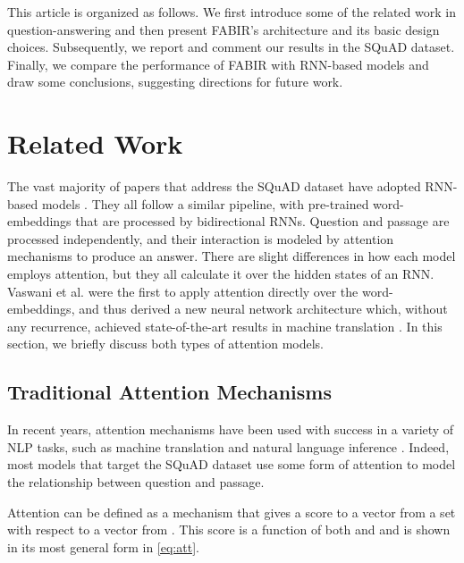 \documentclass[conference, letterpaper, 10pt]{IEEEtran}
\begin{document}
This article is organized as follows. We first introduce some of the related work in question-answering and then present FABIR's architecture and its basic design choices. Subsequently, we report and comment our results in the SQuAD dataset. Finally, we compare the performance of FABIR with RNN-based models and draw some conclusions, suggesting directions for future work.


\section{Related Work}

The vast majority of papers that address the SQuAD dataset have adopted RNN-based models \cite{Hu2017,PanLZCCH17,Salant2017,Xiaodong2017,Yang2017,Hsin2017,  DBLP:journals/corr/abs-1711-00106,RiuLiu2017,bidaf+self-att,Zhequian2017,DBLP:journals/corr/GongB17,DBLP:journals/corr/ZhangZCDWJ17,DBLP:journals/corr/ShenHGC16,Chen2017,DBLP:journals/corr/LeeKP016,DBLP:journals/corr/WeissenbornWS17,DBLP:journals/corr/WangMHF16,DBLP:journals/corr/LiuHWYN17,Seo2016,Xiong2016,Wang16,DBLP:journals/corr/YangDYHCS16,DBLP:journals/corr/BahdanauBJGVB17,DBLP:journals/corr/YuZHYXZ16}. 
They all follow a similar pipeline, with pre-trained word-embeddings that are processed by bidirectional RNNs. Question and passage are processed independently, and their interaction is modeled by attention mechanisms \cite{Bahdanau2014} to produce an answer. There are slight differences in how each model employs attention, but they all calculate it over the hidden states of an RNN. Vaswani et al. were the first to apply attention directly over the word-embeddings, and thus derived a new neural network architecture which, without any recurrence, achieved state-of-the-art results in machine translation \cite{Vaswani}. In this section, we briefly discuss both types of attention models.

\subsection{Traditional Attention Mechanisms}
In recent years, attention mechanisms have been used with success in a variety of NLP tasks, such as machine translation \cite{Bahdanau2014,Vaswani} and natural language inference \cite{Rocktaschel16,WangJ15b}. Indeed, most models that target the SQuAD dataset use some form of attention to model the relationship between question and passage.

Attention can be defined as a mechanism that gives a score  to a vector  from a set  with respect to a vector  from . This score is a function of both  and  and is shown in its most general form in \eqref{eq:att}.
\end{document}
